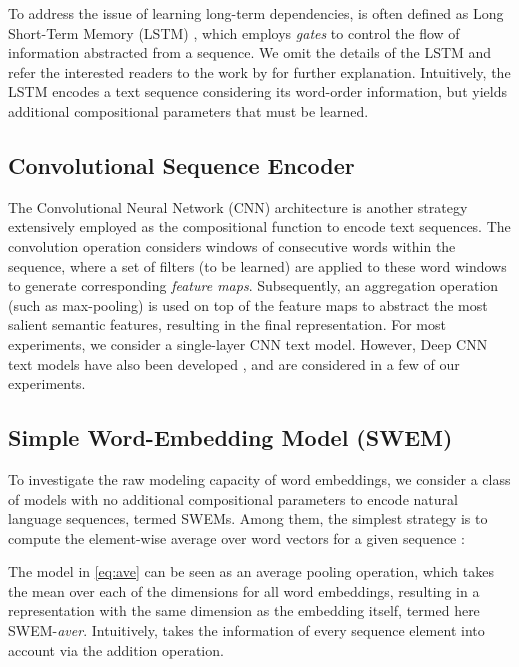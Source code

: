\documentclass[11pt,a4paper]{article}
\begin{document}
To address the issue of learning long-term dependencies,  is often defined as Long Short-Term Memory (LSTM) \citep{hochreiter1997long}, which employs \emph{gates} to control the flow of information abstracted from a sequence.
We omit the details of the LSTM and refer the interested readers to the work by \citet{graves2013hybrid} for further explanation.
Intuitively, the LSTM encodes a text sequence considering its word-order information, but yields additional compositional parameters that must be learned.

\subsection{Convolutional Sequence Encoder}\label{cnn}
The Convolutional Neural Network (CNN) architecture \citep{kim2014convolutional, collobert2011natural, gan2017learning, zhang2017deconvolutional, shen2017deconvolutional} is another strategy extensively employed as the compositional function to encode text sequences.
The convolution operation considers windows of  consecutive words within the sequence, where a set of filters (to be learned) are applied to these word windows to generate corresponding \emph{feature maps}.
Subsequently, an aggregation operation (such as max-pooling) is used on top of the feature maps to abstract the most salient semantic features, resulting in the final representation.
For most experiments, we consider a single-layer CNN text model.
However, Deep CNN text models have also been developed \citep{conneau2016very}, and are considered in a few of our experiments.

\subsection{Simple Word-Embedding Model (SWEM)}\label{swem}
\vspace{-1mm}
To investigate the raw modeling capacity of word embeddings, we consider a class of models with no additional compositional parameters to encode natural language sequences, termed SWEMs.
Among them, the simplest strategy is to compute the element-wise average over word vectors for a given sequence \cite{wieting2015towards, adi2016fine}:
\vspace{-2mm}

The model in \eqref{eq:ave} can be seen as an average pooling operation, which takes the mean over each of the  dimensions for all word embeddings, resulting in a representation  with the same dimension as the embedding itself, termed here SWEM-\emph{aver}.
Intuitively,  takes the information of every sequence element into account via the addition operation.
\end{document}
